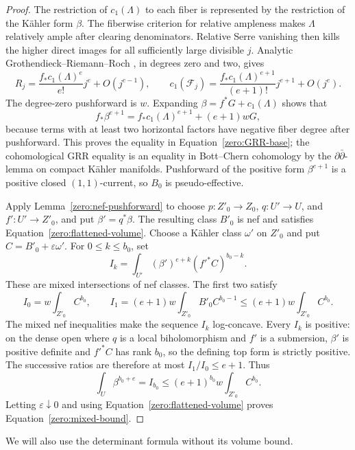 \begin{proof}
The restriction of \(c_1(\Lambda)\) to each fiber is represented by the
restriction of the Kähler form \(\beta\).  The fiberwise criterion for
relative ampleness makes \(\Lambda\) relatively ample after clearing
denominators.  Relative Serre vanishing then kills the higher direct
images for all sufficiently large divisible \(j\).  Analytic
Grothendieck--Riemann--Roch \cite{LevyGRR}, in degrees zero and two, gives
\[
 R_j=\frac{f_*c_1(\Lambda)^e}{e!}j^e+O(j^{e-1}),\qquad
 c_1(\mathcal F_j)
 =\frac{f_*c_1(\Lambda)^{e+1}}{(e+1)!}j^{e+1}+O(j^e).
\]
The degree-zero pushforward is \(w\).  Expanding
\(\beta=f^*G+c_1(\Lambda)\) shows that
\[
 f_*\beta^{e+1}
 =f_*c_1(\Lambda)^{e+1}+(e+1)wG,
\]
because terms with at least two horizontal factors have negative
fiber degree after pushforward.  This proves the equality in
Equation~\eqref{zero:GRR-base}; the cohomological GRR equality is an equality in
Bott--Chern cohomology by the \(\partial\bar\partial\)-lemma on compact
Kähler manifolds.  Pushforward of the positive form
\(\beta^{e+1}\) is a positive closed \((1,1)\)-current, so \(B_0\) is
pseudo-effective.

Apply Lemma~\ref{zero:nef-pushforward} to choose \(p:Z'_0\to Z_0\),
\(q:U'\to U\), and \(f':U'\to Z'_0\), and put \(\beta'=q^*\beta\).
The resulting class \(B'_0\) is nef and satisfies
Equation~\eqref{zero:flattened-volume}.
Choose a Kähler class \(\omega'\) on \(Z'_0\) and put
\(C=B'_0+\varepsilon\omega'\).  For \(0\le k\le b_0\), set
\[
 I_k=\int_{U'}(\beta')^{e+k}(f'^*C)^{b_0-k}.
\]
These are mixed intersections of nef classes.  The first two satisfy
\[
 I_0=w\int_{Z'_0}C^{b_0},\qquad
 I_1=(e+1)w\int_{Z'_0}B'_0C^{b_0-1}
       \le(e+1)w\int_{Z'_0}C^{b_0}.
\]
The mixed nef inequalities make the sequence \(I_k\) log-concave.
Every \(I_k\) is positive: on the dense open where \(q\) is a local
biholomorphism and \(f'\) is a submersion, \(\beta'\) is positive
definite and \(f'^*C\) has rank \(b_0\), so the defining top form
is strictly positive.  The successive ratios are therefore at most
\(I_1/I_0\le e+1\).  Thus
\[
 \int_U\beta^{b_0+e}=I_{b_0}
   \le(e+1)^{b_0}w\int_{Z'_0}C^{b_0}.
\]
Letting \(\varepsilon\downarrow0\) and using
Equation~\eqref{zero:flattened-volume} proves Equation~\eqref{zero:mixed-bound}.
\end{proof}

We will also use the determinant formula without its volume bound.

